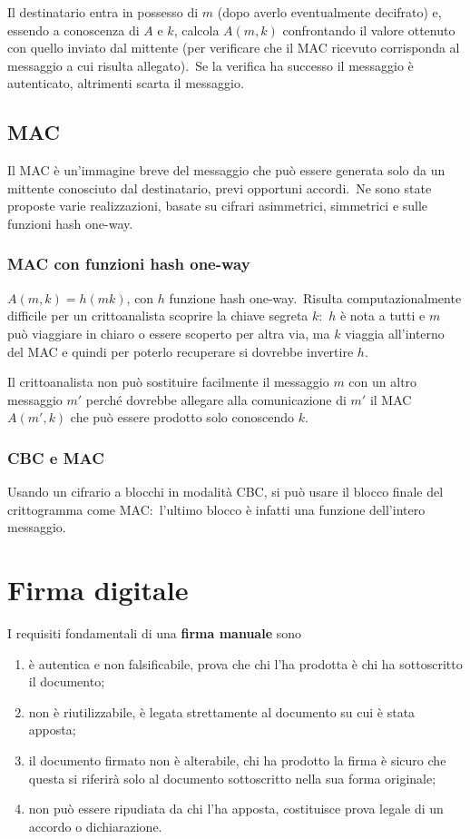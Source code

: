 Il destinatario entra in possesso di $m$ (dopo averlo eventualmente decifrato) e, essendo a conoscenza di $A$ e $k$, calcola $A(m,k)$ confrontando il valore ottenuto con quello inviato dal mittente (per verificare che il MAC ricevuto corrisponda al messaggio a cui risulta allegato).\
Se la verifica ha successo il messaggio è autenticato, altrimenti scarta il messaggio.\

\subsection{MAC}

Il MAC è un'immagine breve del messaggio che può essere generata solo da un mittente conosciuto dal destinatario, previ opportuni accordi.\
Ne sono state proposte varie realizzazioni, basate su cifrari asimmetrici, simmetrici e sulle funzioni hash one-way.\

\subsubsection{MAC con funzioni hash one-way}

$A(m,k) = h(mk)$, con $h$ funzione hash one-way.\
Risulta computazionalmente difficile per un crittoanalista scoprire la chiave segreta $k$:\ $h$ è nota a tutti e $m$ può viaggiare in chiaro o essere scoperto per altra via, ma $k$ viaggia all'interno del MAC e quindi per poterlo recuperare si dovrebbe invertire $h$.\

Il crittoanalista non può sostituire facilmente il messaggio $m$ con un altro messaggio $m'$ perché dovrebbe allegare alla comunicazione di $m'$ il MAC $A(m', k)$ che può essere prodotto solo conoscendo $k$.\

\subsubsection{CBC e MAC}

Usando un cifrario a blocchi in modalità CBC, si può usare il blocco finale del crittogramma come MAC:\ l'ultimo blocco è infatti una funzione dell'intero messaggio.\

\section{Firma digitale}

I requisiti fondamentali di una \textbf{firma manuale} sono

\begin{enumerate}
    \item è autentica e non falsificabile, prova che chi l'ha prodotta è chi ha sottoscritto il documento;
    \item non è riutilizzabile, è legata strettamente al documento su cui è stata apposta;
    \item il documento firmato non è alterabile, chi ha prodotto la firma è sicuro che questa si riferirà solo al documento sottoscritto nella sua forma originale;
    \item non può essere ripudiata da chi l'ha apposta, costituisce prova legale di un accordo o dichiarazione.
\end{enumerate}

